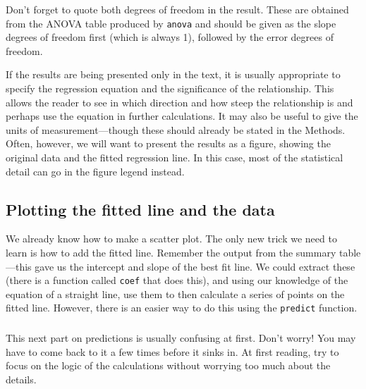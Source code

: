 \documentclass[
]{book}
\newenvironment{greybox}{
  \definecolor{shadecolor}{rgb}{0.95,0.95,0.95}  %
  \color{black}
  \begin{shaded}}
 {\end{shaded}}
\newenvironment{infobox}[1]
  {
  \begin{itemize}
  \renewcommand{\labelitemi}{
    \raisebox{-.7\height}[0pt][0pt]{
      {\setkeys{Gin}{width=3em,keepaspectratio}
        \texttt{[image: images/\#1]}}
    }
  }
  \setlength{\fboxsep}{1em}
  \begin{greybox}
  \item
  }
  {
  \end{greybox}
  \end{itemize}
  }
\begin{document}
Don't forget to quote both degrees of freedom in the result. These are obtained from the ANOVA table produced by \texttt{anova} and should be given as the slope degrees of freedom first (which is always 1), followed by the error degrees of freedom.

If the results are being presented only in the text, it is usually appropriate to specify the regression equation and the significance of the relationship. This allows the reader to see in which direction and how steep the relationship is and perhaps use the equation in further calculations. It may also be useful to give the units of measurement---though these should already be stated in the Methods. Often, however, we will want to present the results as a figure, showing the original data and the fitted regression line. In this case, most of the statistical detail can go in the figure legend instead.

\hypertarget{plotting-the-fitted-line-and-the-data}{%
\subsection{Plotting the fitted line and the data}\label{plotting-the-fitted-line-and-the-data}}

We already know how to make a scatter plot. The only new trick we need to learn is how to add the fitted line. Remember the output from the summary table---this gave us the intercept and slope of the best fit line. We could extract these (there is a function called \texttt{coef} that does this), and using our knowledge of the equation of a straight line, use them to then calculate a series of points on the fitted line. However, there is an easier way to do this using the \texttt{predict} function.

\begin{infobox}{action}

\hypertarget{section-7}{%
\subsubsection*{}\label{section-7}}

This next part on predictions is usually confusing at first. Don't worry! You may have to come back to it a few times before it sinks in. At first reading, try to focus on the logic of the calculations without worrying too much about the details.

\end{infobox}
\end{document}
